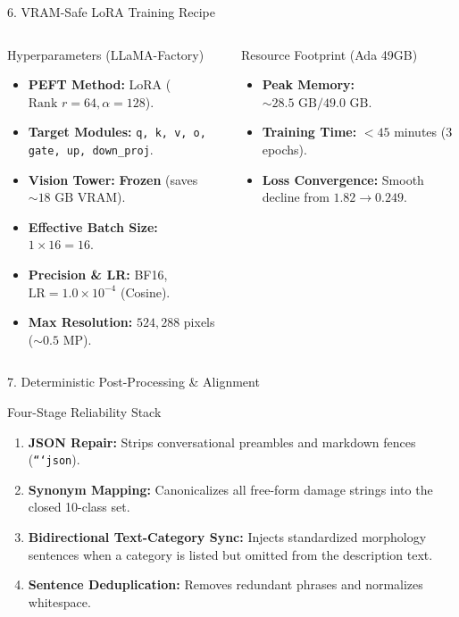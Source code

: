 \documentclass[aspectratio=169]{beamer}
\begin{document}
\begin{frame}{6. VRAM-Safe LoRA Training Recipe}
  \begin{columns}
    \begin{block}{Hyperparameters (LLaMA-Factory)}
      \begin{itemize}\footnotesize
        \item \textbf{PEFT Method:} LoRA ($\text{Rank } r = 64, \alpha = 128$).
        \item \textbf{Target Modules:} \texttt{q, k, v, o, gate, up, down\_proj}.
        \item \textbf{Vision Tower:} \textbf{Frozen} (saves $\sim 18\text{ GB}$ VRAM).
        \item \textbf{Effective Batch Size:} $1 \times 16 = 16$.
        \item \textbf{Precision \& LR:} BF16, $\text{LR} = 1.0 \times 10^{-4}$ (Cosine).
        \item \textbf{Max Resolution:} $524,288$ pixels ($\sim 0.5\text{ MP}$).
      \end{itemize}
    \end{block}
    \begin{block}{Resource Footprint (Ada 49GB)}
      \begin{itemize}\footnotesize
        \item \textbf{Peak Memory:} $\sim 28.5\text{ GB} / 49.0\text{ GB}$.
        \item \textbf{Training Time:} $< 45$ minutes ($3$ epochs).
        \item \textbf{Loss Convergence:} Smooth decline from $1.82 \to 0.249$.
      \end{itemize}
    \end{block}
  \end{columns}
\end{frame}

\begin{frame}{7. Deterministic Post-Processing \& Alignment}
  \begin{block}{Four-Stage Reliability Stack}
    \begin{enumerate}\small
      \item \textbf{JSON Repair:} Strips conversational preambles and markdown fences (\texttt{```json}).
      \item \textbf{Synonym Mapping:} Canonicalizes all free-form damage strings into the closed 10-class set.
      \item \textbf{Bidirectional Text-Category Sync:} Injects standardized morphology sentences when a category is listed but omitted from the description text.
      \item \textbf{Sentence Deduplication:} Removes redundant phrases and normalizes whitespace.
    \end{enumerate}
  \end{block}
\end{frame}
\end{document}
